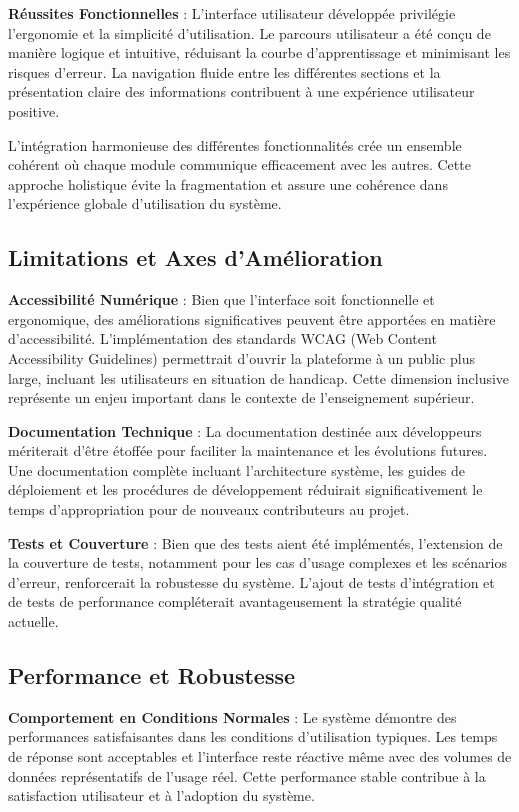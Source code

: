 \documentclass[12pt,a4paper]{report}
\begin{document}
\textbf{Réussites Fonctionnelles} : L'interface utilisateur développée privilégie l'ergonomie et la simplicité d'utilisation. Le parcours utilisateur a été conçu de manière logique et intuitive, réduisant la courbe d'apprentissage et minimisant les risques d'erreur. La navigation fluide entre les différentes sections et la présentation claire des informations contribuent à une expérience utilisateur positive.

L'intégration harmonieuse des différentes fonctionnalités crée un ensemble cohérent où chaque module communique efficacement avec les autres. Cette approche holistique évite la fragmentation et assure une cohérence dans l'expérience globale d'utilisation du système.

\subsection{Limitations et Axes d'Amélioration}

\textbf{Accessibilité Numérique} : Bien que l'interface soit fonctionnelle et ergonomique, des améliorations significatives peuvent être apportées en matière d'accessibilité. L'implémentation des standards WCAG (Web Content Accessibility Guidelines) permettrait d'ouvrir la plateforme à un public plus large, incluant les utilisateurs en situation de handicap. Cette dimension inclusive représente un enjeu important dans le contexte de l'enseignement supérieur.

\textbf{Documentation Technique} : La documentation destinée aux développeurs mériterait d'être étoffée pour faciliter la maintenance et les évolutions futures. Une documentation complète incluant l'architecture système, les guides de déploiement et les procédures de développement réduirait significativement le temps d'appropriation pour de nouveaux contributeurs au projet.

\textbf{Tests et Couverture} : Bien que des tests aient été implémentés, l'extension de la couverture de tests, notamment pour les cas d'usage complexes et les scénarios d'erreur, renforcerait la robustesse du système. L'ajout de tests d'intégration et de tests de performance compléterait avantageusement la stratégie qualité actuelle.

\subsection{Performance et Robustesse}

\textbf{Comportement en Conditions Normales} : Le système démontre des performances satisfaisantes dans les conditions d'utilisation typiques. Les temps de réponse sont acceptables et l'interface reste réactive même avec des volumes de données représentatifs de l'usage réel. Cette performance stable contribue à la satisfaction utilisateur et à l'adoption du système.
\end{document}
